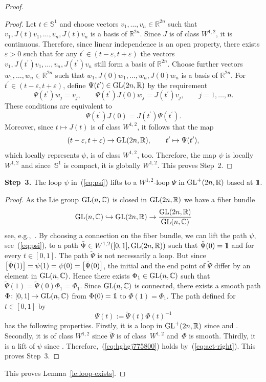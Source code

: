 \documentclass[pdftex]{sigma}
\numberwithin{equation}{section}
\newcommand{\C}{{\mathbb{C}}}
\newcommand{\R}{{\mathbb{R}}}
\renewcommand{\SS}{{\mathbb{S}}}
\newcommand{\eps}{{\varepsilon}}
\newcommand{\GL}{{\rm GL}}
\newcommand{\INTO}{\hookrightarrow} %
\newcommand{\1}{{{\mathchoice {\rm 1\mskip-4mu l} {\rm 1\mskip-4mu l}
{\rm 1\mskip-4.5mu l} {\rm 1\mskip-5mu l}}}}
\begin{document}
\begin{proof}
\begin{proof}
Let $t\in\SS^1$ and choose vectors $v_1,\dots,v_n\in\R^{2n}$ such that
$v_1,J(t)v_1,\dots,v_n,J(t)v_n$ is a basis of $\R^{2n}$.
Since $J$ is of class $W^{1,2}$, it is continuous.
Therefore, since linear independence is an open property, there exists
$\eps>0$ such that for any $t^\prime\in(t-\eps,t+\eps)$
the vectors $v_1,J(t^\prime)v_1,\dots,v_n,J(t^\prime)v_n$
still form a basis of $\R^{2n}$.
Choose further vectors $w_1,\dots,w_n\in\R^{2n}$
such that $w_1,J(0)w_1,\dots,w_n,J(0)w_n$ is a basis of $\R^{2n}$.
For $t^\prime\in(t-\eps,t+\eps)$, define
$\Psi(t^\prime)\in \GL(2n,\R)$ by the requirement
\[
 \Psi(t^\prime)w_j=v_j
 ,\qquad
 \Psi(t^\prime)J(0)w_j=J(t^\prime)v_j
 ,\qquad
 j=1,\dots, n .
\]
These conditions are equivalent to
\[
 \Psi(t^\prime)J(0)=J(t^\prime)\Psi(t^\prime).
\]
Moreover, since $t\mapsto J(t)$ is of class $W^{1,2}$,
it follows that the map
\[
 (t-\eps,t+\eps)\to \GL(2n,\R)
 ,\qquad
 t^\prime\mapsto\Psi(t^\prime),
\]
which locally represents $\psi$, is of class $W^{1,2}$, too.
Therefore, the map $\psi$ is locally $W^{1,2}$ and since~$\SS^1$ is
compact, it is globally $W^{1,2}$.
This proves Step~2.
\end{proof}

\noindent
\textbf{Step~3.}
The loop $\psi$ in~(\ref{eq:psi})
lifts to a $W^{1,2}$-loop $\Psi$ in
$\GL^+(2n,\R)$ based at $\1$.

\begin{proof}
As the Lie group $\GL(n,\C)$ is closed in $\GL(2n,\R)$
we have a fiber bundle
\[
 \GL(n,\C)\INTO \GL(2n,\R)\to\frac{\GL(2n,\R)}{\GL(n,\C)}
\]
see, e.g.,~\cite[Chapter~II, end of Section~13]{bredon:1993a}.
By choosing a connection on the fiber bundle,
we can lift the path $\psi$, see~(\ref{eq:psi}),
to a path $\tilde\Psi\in W^{1,2}([0,1], \GL(2n,\R))$
such that $\tilde\Psi(0)=\1$ and
 for every $t\in[0,1]$.
The path $\tilde\Psi$ is not necessarily a loop.
But since
$\smash{\bigl[\tilde\Psi(1)\bigr]}=\psi(1)=\psi(0)=\smash{\bigl[\tilde\Psi(0)\bigr]}$,
the initial and the end point of $\tilde\Psi$ differ by an element in $\GL(n,\C)$.
Hence there exists $\Phi_1\in \GL(n,\C)$ such that
$\tilde\Psi(1)=\tilde\Psi(0)\Phi_1=\Phi_1$.
Since $\GL(n,\C)$ is connected,
there exists a smooth path $\Phi\colon[0,1]\to \GL(n,\C)$
from $\Phi(0)=\1$ to $\Phi(1)=\Phi_1$.
The path defined for $t\in[0,1]$ by
\[
 \Psi(t):=\tilde\Psi(t)\Phi(t)^{-1}
\]
has the following properties.
Firstly, it is a loop in $\GL^+(2n,\R)$ since
\smash{$
\Psi(0):=\tilde\Psi(0)\Phi(0)^{-1}=\1
$}
and
\smash{$
\Psi(1):=\tilde\Psi(1)\Phi(1)^{-1}=\Phi(1)\Phi(1)^{-1}=\1
$}.
Secondly, it is of class $W^{1,2}$ since
$\tilde\Psi$ is of class~$W^{1,2}$ and~$\Phi$ is smooth.
Thirdly, it is a lift of $\psi$ since
.
Therefore,~(\ref{eq:hghgj775800}) holds by~(\ref{eq:act-right}).
This proves Step~3.
\end{proof}

This proves Lemma~\ref{le:loop-exists}.
\end{proof}
\end{document}
